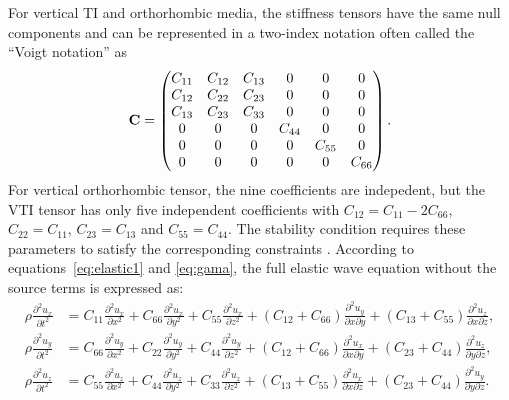 
For vertical TI and orthorhombic media, the stiffness tensors have the same null components and can
be represented in a two-index notation \cite[]{musgrave} often called the “Voigt notation” as
\begin{equation}
\mathbf{C} =
\begin{pmatrix}C_{11} &C_{12} &C_{13} &0 &0 &0 \cr
         C_{12} &C_{22} &C_{23} &0 &0 &0 \cr
         C_{13} &C_{23} &C_{33} &0 &0 &0 \cr
         0& 0&  0 & C_{44} &0 &0 \cr
         0& 0&  0 &0 & C_{55} &0 \cr
         0& 0&  0 &0 &0 &C_{66}\end{pmatrix}.
\end{equation}
For vertical orthorhombic tensor, the nine coefficients are indepedent, but the VTI tensor has only 
five independent coefficients with $C_{12}=C_{11}-2C_{66}$, $C_{22}=C_{11}$, $C_{23}=C_{13}$ and $C_{55}=C_{44}$.
The stability condition requires these parameters to satisfy the corresponding constraints \cite[]{helbig:1994, tsvankin:2001}.
According to equations~\ref{eq:elastic1} and \ref{eq:gama}, the full elastic wave equation without the source terms is expressed as:
\begin{equation}
\begin{split}
\rho\frac{\partial^2{u_x}}{\partial t^2} &= C_{11}\frac{\partial^2{u_x}}{\partial x^2}
                                         + C_{66}\frac{\partial^2{u_x}}{\partial y^2}
                                         + C_{55}\frac{\partial^2{u_x}}{\partial z^2}
                                         +(C_{12}+C_{66})\frac{\partial^2{u_y}}{{\partial x}{\partial y}}
                                         +(C_{13}+C_{55})\frac{\partial^2{u_z}}{{\partial x}{\partial z}}, \\
\rho\frac{\partial^2{u_y}}{\partial t^2} &= C_{66}\frac{\partial^2{u_y}}{\partial x^2}
                                         + C_{22}\frac{\partial^2{u_y}}{\partial y^2}
                                         + C_{44}\frac{\partial^2{u_y}}{\partial z^2}
                                         +(C_{12}+C_{66})\frac{\partial^2{u_x}}{{\partial x}{\partial y}}
                                         +(C_{23}+C_{44})\frac{\partial^2{u_z}}{{\partial y}{\partial z}}, \\
\rho\frac{\partial^2{u_z}}{\partial t^2} &= C_{55}\frac{\partial^2{u_z}}{\partial x^2}
                                         + C_{44}\frac{\partial^2{u_z}}{\partial y^2}
                                         + C_{33}\frac{\partial^2{u_z}}{\partial z^2} 
                                         +(C_{13}+C_{55})\frac{\partial^2{u_x}}{{\partial x}{\partial z}}
                                         +(C_{23}+C_{44})\frac{\partial^2{u_y}}{{\partial y}{\partial z}}.
\end{split}
\end{equation}
